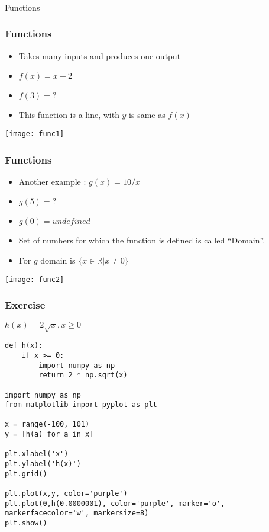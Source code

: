\begin{frame}[fragile]\frametitle{}
\begin{center}
{\Large Functions}
\end{center}
\end{frame}

 \begin{frame}[fragile]\frametitle{Functions}
\begin{itemize}
\item Takes many inputs and produces one output
\item $f(x) = x + 2$
\item $f(3)=?$
\item This function is a line, with $y$ is same as $f(x)$
\end{itemize}
\begin{center}
\texttt{[image: func1]}
\end{center}
\end{frame}

 \begin{frame}[fragile]\frametitle{Functions}
\begin{itemize}
\item Another example : $g(x) = 10/x$
\item $g(5)=?$
\item $g(0)=undefined$
\item Set of numbers for which the function is defined is called ``Domain''.
\item For $g$ domain is $\{x \in \mathbb{R} | x \neq 0\}$
\end{itemize}
\begin{center}
\texttt{[image: func2]}
\end{center}
\end{frame}

 \begin{frame}[fragile]\frametitle{Exercise}
$h(x) = 2 \sqrt{x}, x \geq 0$

\begin{lstlisting}
def h(x):
    if x >= 0:
        import numpy as np
        return 2 * np.sqrt(x)

import numpy as np
from matplotlib import pyplot as plt

x = range(-100, 101)
y = [h(a) for a in x]

plt.xlabel('x')
plt.ylabel('h(x)')
plt.grid()

plt.plot(x,y, color='purple')
plt.plot(0,h(0.0000001), color='purple', marker='o', markerfacecolor='w', markersize=8)
plt.show()
\end{lstlisting}
\end{frame}

